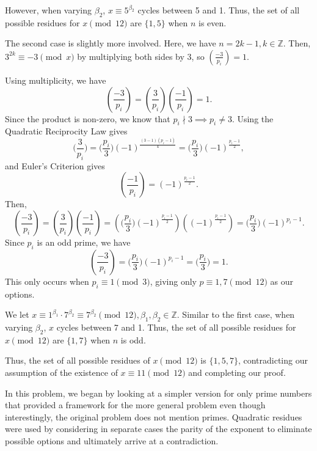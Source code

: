 \documentclass{article}
\newcommand{\Z}{\mathbb{Z}}
\newcommand{\qrbg}[2]{\bigg( \frac{#1}{#2}\bigg)}
\newcommand{\qrn}[2]{\left( \frac{#1}{#2}\right)}
\begin{document}
However, when varying $\beta_2$, $x \equiv 5^{\beta_2}$ cycles between 5 and 1. Thus, the set of all possible residues for $x \pmod {12}$ are $\{1,5\}$ when $n$ is even.

The second case is slightly more involved. Here, we have $n = 2k-1, k \in \Z$. Then, $3^{2k} \equiv -3 \pmod x$ by multiplying both sides by $3$, so $\qrn{-3}{p_i} = 1$.

Using multiplicity, we have \[\left(\frac{-3}{p_i}\right)=\left(\frac{3}{p_i}\right) \left(\frac{-1}{p_i}\right) = 1.\]
Since the product is non-zero, we know that $p_i \nmid 3 \implies p_i \neq 3$.
Using the Quadratic Reciprocity Law gives \[\qrbg{3}{p_i} =\qrbg{p_i}{3}(-1)^{\frac{(3-1)(p_i-1)}{4}}=\qrbg{p_i}{3}(-1)^{\frac{p_i-1}{2}},\] and Euler's Criterion gives
\[\left(\frac{-1}{p_i}\right)=(-1)^{\frac{p_i-1}{2}}.\]
Then, \[\left(\frac{-3}{p_i}\right)=\left(\frac{3}{p_i}\right) \left(\frac{-1}{p_i}\right) = \left(\qrbg{p_i}{3}(-1)^{\frac{p_i-1}{2}}\right)\left((-1)^{\frac{p_i-1}{2}}\right) = \qrbg{p_i}{3} (-1)^{p_i-1}.\]
Since $p_i$ is an odd prime, we have
\[\qrn{-3}{p_i} = \qrbg{p_i}{3} (-1)^{p_i-1} = \qrbg{p_i}{3}= 1.\]
This only occurs when $p_i \equiv 1 \pmod 3$, giving only $p \equiv 1, 7 \pmod{12}$ as our options.

We let $x \equiv 1^{\beta_1} \cdot 7^{\beta_2} \equiv 7^{\beta_2} \pmod{12}, \beta_1, \beta_2 \in \Z$. Similar to the first case, when varying $\beta_2$, $x$ cycles between 7 and 1. Thus, the set of all possible residues for $x \pmod {12}$ are $\{1,7\}$ when $n$ is odd.

Thus, the set of all possible residues of $x \pmod{12}$ is $\{1, 5, 7\}$, contradicting our assumption of the existence of $x \equiv 11 \pmod {12}$ and completing our proof.

In this problem, we began by looking at a simpler version for only prime numbers that provided a framework for the more general problem even though interestingly, the original problem does not mention primes. Quadratic residues were used by considering in separate cases the parity of the exponent to eliminate possible options and ultimately arrive at a contradiction.
\end{document}
